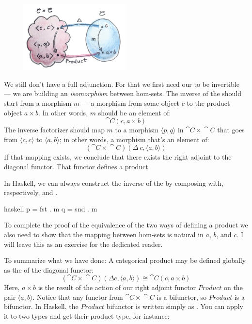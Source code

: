 \begin{figure}[H]
  \centering
  \includegraphics[width=0.5\textwidth]{images/adj-product.jpg}
\end{figure}

\noindent
We still don't have a full adjunction. For that we first need our
 to be invertible --- we are building an
\emph{isomorphism} between hom-sets. The inverse of the
 should start from a morphism $m$ --- a
morphism from some object $c$ to the product object $a\times{}b$.
In other words, $m$ should be an element of:
\[\cat{C}(c, a\times{}b)\]
The inverse factorizer should map $m$ to a morphism
$\langle p, q \rangle$ in $\cat{C}\times{}\cat{C}$ that goes from
$\langle c, c \rangle$ to
$\langle a, b \rangle$; in other words, a morphism
that's an element of:
\[(\cat{C}\times{}\cat{C})(\Delta\ c, \langle a, b \rangle)\]
If that mapping exists, we conclude that there exists the right adjoint
to the diagonal functor. That functor defines a product.

In Haskell, we can always construct the inverse of the
 by composing  with, respectively,
 and .

\begin{snip}{haskell}
p = fst . m
q = snd . m
\end{snip}
To complete the proof of the equivalence of the two ways of defining a
product we also need to show that the mapping between hom-sets is
natural in $a$, $b$, and $c$. I will leave this as
an exercise for the dedicated reader.

To summarize what we have done: A categorical product may be defined
globally as the  of the diagonal functor:
\[(\cat{C}\times{}\cat{C})(\Delta c, \langle a, b \rangle) \cong \cat{C}(c, a\times{}b)\]
Here, $a\times{}b$ is the result of the action of our right adjoint
functor $\mathit{Product}$ on the pair
$\langle a, b \rangle$. Notice that any functor from
$\cat{C}\times{}\cat{C}$ is a bifunctor, so $\mathit{Product}$ is a bifunctor. In
Haskell, the $\mathit{Product}$ bifunctor is written simply as
\code{(,)}. You can apply it to two types and get their product type,
for instance:

